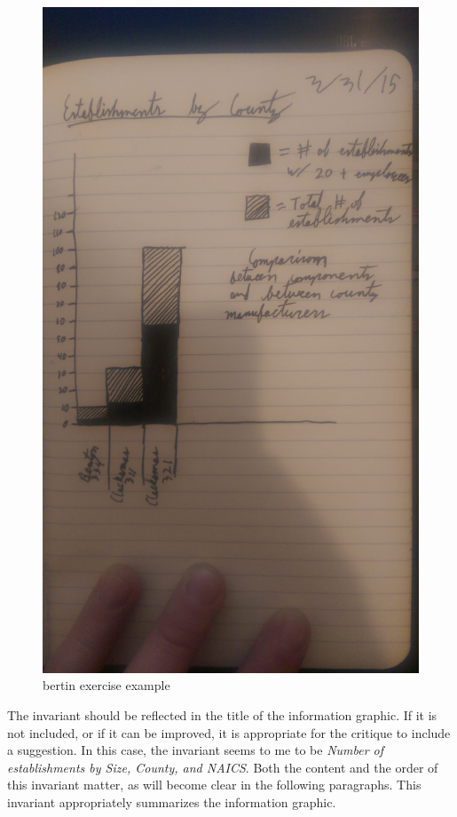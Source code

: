 \begin{figure}
\centering
\includegraphics{./fiBertinExExmpl.jpg}
\caption{bertin exercise example}
\end{figure}

\hypertarget{the-invariant}{%
\label{the-invariant}}

The invariant should be reflected in the title of the information
graphic. If it is not included, or if it can be improved, it is
appropriate for the critique to include a suggestion. In this case, the
invariant seems to me to be \emph{Number of establishments by Size,
County, and NAICS}. Both the content and the order of this invariant
matter, as will become clear in the following paragraphs. This invariant
appropriately summarizes the information graphic.

